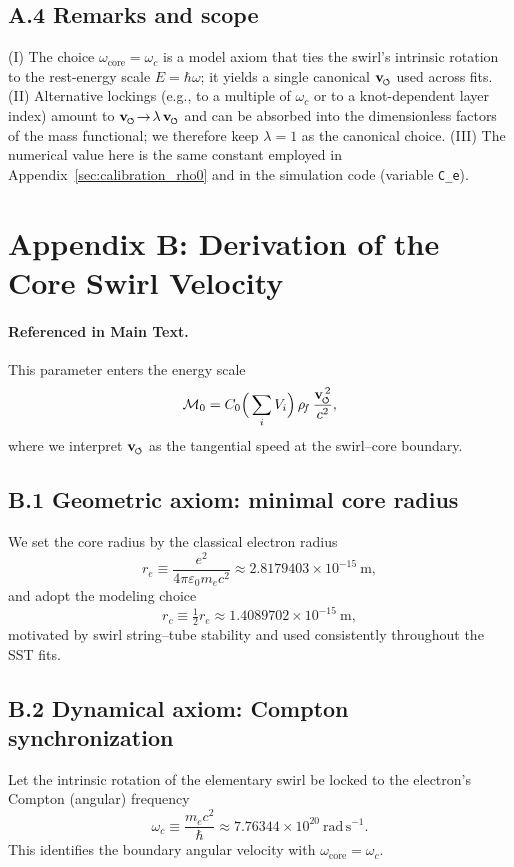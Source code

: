 \documentclass[smallextended]{svjour3}       %
\newcommand{\swirlarrow}{%
	\mathchoice{\mkern-2mu\scriptstyle\boldsymbol{\circlearrowleft}}%
	{\mkern-2mu\scriptstyle\boldsymbol{\circlearrowleft}}%
	{\mkern-2mu\scriptscriptstyle\boldsymbol{\circlearrowleft}}%
	{\mkern-2mu\scriptscriptstyle\boldsymbol{\circlearrowleft}}%
}
\newcommand{\vswirl}{\mathbf{v}_{\swirlarrow}}
\newcommand{\rhoF}{\rho_{\!f}}      %
\begin{document}
	\subsection*{A.4 Remarks and scope}
	(I) The choice \(\omega_{\text{core}}=\omega_c\) is a model axiom that ties the swirl’s intrinsic rotation to the rest-energy scale \(E=\hbar\omega\); it yields a single canonical \(\vswirl\) used across fits.
	(II) Alternative lockings (e.g., to a multiple of \(\omega_c\) or to a knot-dependent layer index) amount to \(\vswirl\!\to\! \lambda\,\vswirl\) and can be absorbed into the dimensionless factors of the mass functional; we therefore keep \(\lambda=1\) as the canonical choice.
	(III) The numerical value here is the same constant employed in Appendix~\ref{sec:calibration_rho0} and in the simulation code (variable \texttt{C\_e}).

\section*{Appendix B: Derivation of the Core Swirl Velocity}
\label{sec:core_swirl_velocity}

	\paragraph{Referenced in Main Text.}
	This parameter enters the energy scale
	\[
		\mathcal{M}_0 = C_0 \Big(\sum_i V_i\Big)\,\rhoF\,\frac{\vswirl^{\,2}}{c^2},
	\]
	where we interpret \(\vswirl\) as the tangential speed at the swirl–core boundary.

	\subsection*{B.1 Geometric axiom: minimal core radius}
	We set the core radius by the classical electron radius
	\[
		r_e \equiv \frac{e^2}{4\pi \varepsilon_0 m_e c^2} \approx 2.8179403\times10^{-15}\ \mathrm{m},
	\]
	and adopt the modeling choice
	\[
		r_c \equiv \tfrac12 r_e \approx 1.4089702\times10^{-15}\ \mathrm{m},
	\]
	motivated by swirl string–tube stability and used consistently throughout the SST fits.

	\subsection*{B.2 Dynamical axiom: Compton synchronization}
	Let the intrinsic rotation of the elementary swirl be locked to the electron’s Compton (angular) frequency
	\[
		\omega_c \equiv \frac{m_e c^2}{\hbar} \approx 7.76344\times10^{20}\ \mathrm{rad\,s^{-1}} .
	\]
	This identifies the boundary angular velocity with \(\omega_{\text{core}}=\omega_c\).
\end{document}
